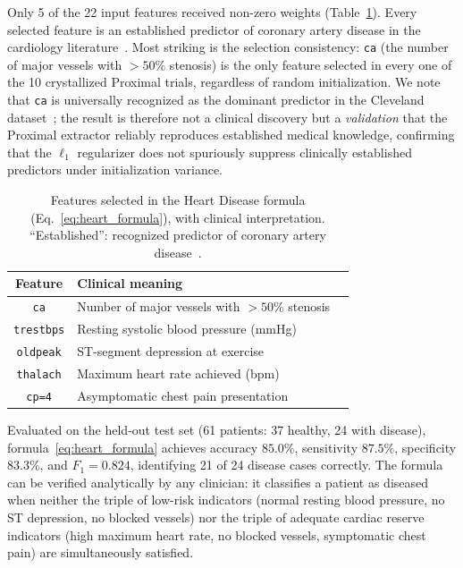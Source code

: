 \documentclass[lettersize,journal]{IEEEtran}
\begin{document}
Only 5 of the 22 input features received non-zero weights
(Table~\ref{tab:heart_features}).
Every selected feature is an established predictor of coronary artery disease
in the cardiology literature~\cite{detrano1989,rudin2019}.
Most striking is the selection consistency: \texttt{ca} (the number of major
vessels with $>50\%$ stenosis) is the only feature selected in every one of
the 10 crystallized Proximal trials, regardless of random initialization.
We note that \texttt{ca} is universally recognized as the dominant predictor
in the Cleveland dataset~\cite{detrano1989}; the result is therefore not a
clinical discovery but a \emph{validation} that the Proximal extractor
reliably reproduces established medical knowledge, confirming that the
$\ell_1$ regularizer does not spuriously suppress clinically established
predictors under initialization variance.

\begin{table}[h]
\centering
\caption{Features selected in the Heart Disease formula (Eq.~\ref{eq:heart_formula}),
with clinical interpretation. ``Established'': recognized predictor
of coronary artery disease~\cite{detrano1989}.}
\label{tab:heart_features}
\setlength{\tabcolsep}{5pt}
\begin{tabular}{cll}
\toprule
Feature & Clinical meaning  \\
\midrule
\texttt{ca}       & Number of major vessels with $>50\%$ stenosis  \\
\texttt{trestbps} & Resting systolic blood pressure (mmHg)         \\
\texttt{oldpeak}  & ST-segment depression at exercise              \\
\texttt{thalach}  & Maximum heart rate achieved (bpm)              \\
\texttt{cp=4}     & Asymptomatic chest pain presentation           \\
\bottomrule
\end{tabular}
\end{table}

Evaluated on the held-out test set (61 patients: 37 healthy, 24 with disease),
formula~\eqref{eq:heart_formula} achieves accuracy $85.0\%$, sensitivity
$87.5\%$, specificity $83.3\%$, and $F_1 = 0.824$, identifying 21 of 24
disease cases correctly.
The formula can be verified analytically by any clinician: it classifies a
patient as diseased when neither the triple of low-risk indicators (normal
resting blood pressure, no ST depression, no blocked vessels) nor the triple
of adequate cardiac reserve indicators (high maximum heart rate, no blocked
vessels, symptomatic chest pain) are simultaneously satisfied.
\end{document}
